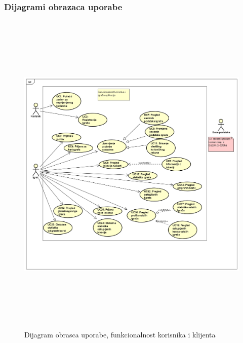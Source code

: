 				\eject
					
				\subsubsection{Dijagrami obrazaca uporabe}
					
					\begin{figure}[H]
						\includegraphics[width=\textwidth, height=16cm]{dijagrami/OU_igrac} 
						\centering
						\caption{Dijagram obrasca uporabe, funkcionalnost korisnika i klijenta}
						\label{}
					\end{figure}
					
